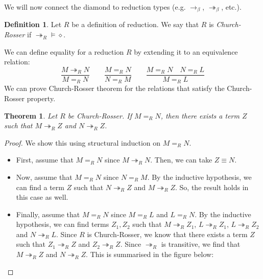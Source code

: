 \documentclass[a4paper, openany]{memoir}
\newtheorem{theorem}[proposition]{Theorem}
\theoremstyle{definition}
\newtheorem{definition}[proposition]{Definition}
\begin{document}
    We will now connect the diamond to reduction types (e.g. $\to_\beta$, $\twoheadrightarrow_\beta$, etc.).
    \begin{definition}
        Let $R$ be a definition of reduction. We say that $R$ is \emph{Church-Rosser} if $\twoheadrightarrow_R {\vDash \diamond}$.
    \end{definition}
    We can define equality for a reduction $R$ by extending it to an equivalence relation:
    \[\frac{M \twoheadrightarrow_R N}{M =_R N} \qquad \frac{M =_R N}{N =_R M} \qquad \frac{M =_R N \quad N =_R L}{M =_R L}\]
    \noindent We can prove Church-Rosser theorem for the relations that satisfy the Church-Rosser property.
    \begin{theorem}
        Let $R$ be Church-Rosser. If $M =_R N$, then there exists a term $Z$ such that $M \twoheadrightarrow_R Z$ and $N \twoheadrightarrow_R Z$.
    \end{theorem}
    \begin{proof}
        We show this using structural induction on $M =_R N$. 
        \begin{itemize}
            \item First, assume that $M =_R N$ since $M \twoheadrightarrow_R N$. Then, we can take $Z \equiv N$.
            
            \item Now, assume that $M =_R N$ since $N =_R M$. By the inductive hypothesis, we can find a term $Z$ such that $N \twoheadrightarrow_R Z$ and $M \twoheadrightarrow_R Z$. So, the result holds in this case as well.
            
            \item Finally, assume that $M =_R N$ since $M =_R L$ and $L =_R N$. By the inductive hypothesis, we can find terms $Z_1, Z_2$ such that $M \twoheadrightarrow_R Z_1$, $L \twoheadrightarrow_R Z_1$, $L \twoheadrightarrow_R Z_2$ and $N \twoheadrightarrow_R L$. Since $R$ is Church-Rosser, we know that there exists a term $Z$ such that $Z_1 \twoheadrightarrow_R Z$ and $Z_2 \twoheadrightarrow_R Z$. Since $\twoheadrightarrow_R$ is transitive, we find that $M \twoheadrightarrow_R Z$ and $N \twoheadrightarrow_R Z$. This is summarised in the figure below:
            \begin{figure}[H]
                \centering
            \end{figure}
        \end{itemize}
    \end{proof}
\end{document}
